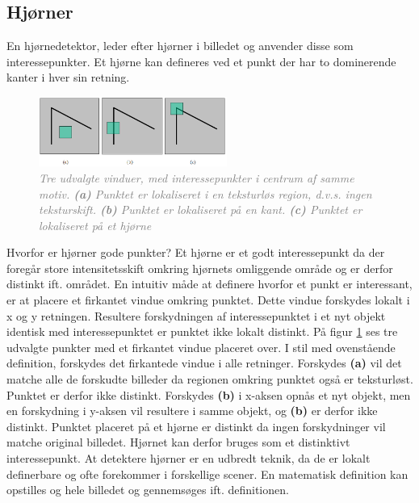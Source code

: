  \subsection{Hjørner}
En hjørnedetektor, leder efter hjørner i billedet og anvender disse som interessepunkter. Et hjørne kan defineres ved et punkt der har to dominerende kanter i hver sin retning.
\begin{figure}[H]
    \centering
    \includegraphics[width=0.55\textwidth]{fig/6.png}
    \vspace{-1em}   
    \begin{center}    
    \caption{\textcolor{gray}{\footnotesize \textit{
     Tre udvalgte vinduer, med interessepunkter i centrum af samme motiv. \textbf{(a)} Punktet er lokaliseret i en teksturløs region, d.v.s. ingen teksturskift. \textbf{(b)} Punktet er lokaliseret på en kant. \textbf{(c)} Punktet er lokaliseret på et hjørne }}}
    \label{fig:2}
     \end{center}
    \vspace{-2.7em}  
  \end{figure}  
\noindent
Hvorfor er hjørner gode punkter? Et hjørne er et godt interessepunkt da der foregår store intensitetsskift omkring hjørnets omliggende område og er derfor distinkt ift. området.
En intuitiv måde at definere hvorfor et punkt er interessant, er at placere et firkantet vindue omkring punktet. Dette vindue forskydes lokalt i x og y retningen. Resultere forskydningen af interessepunktet i  et nyt objekt identisk med interessepunktet er punktet ikke lokalt distinkt. På figur \ref{fig:2} ses tre udvalgte punkter med et firkantet vindue placeret over. I stil med ovenstående definition, forskydes det firkantede vindue i alle retninger. Forskydes \textbf{(a)} vil det matche alle de forskudte billeder da regionen omkring punktet også er teksturløst. Punktet er derfor ikke distinkt. Forskydes \textbf{(b)} i x-aksen opnås et nyt objekt, men en forskydning i y-aksen vil resultere i samme objekt, og \textbf{(b)} er derfor ikke distinkt. Punktet placeret på et hjørne er distinkt da ingen forskydninger vil matche original billedet. Hjørnet kan derfor bruges som et distinktivt interessepunkt. At detektere hjørner er en udbredt teknik, da de er lokalt definerbare og ofte forekommer i forskellige scener. En matematisk definition kan opstilles og hele billedet og gennemsøges ift. definitionen.
